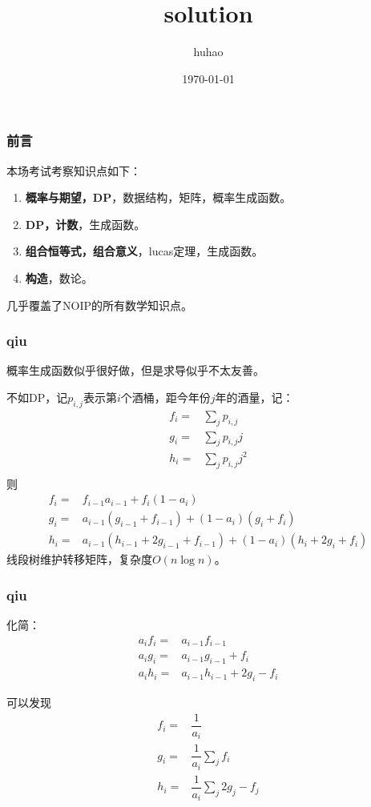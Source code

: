 \documentclass[10pt]{beamer}
\begin{document}
	\title{solution}
	\date{\today}
	\author{huhao}
	\maketitle
	\clearpage
	\begin{frame}
		\frametitle{前言}
		本场考试考察知识点如下：

		\begin{enumerate}
			\item \textbf{概率与期望，DP}，{\color{gray}数据结构，矩阵，概率生成函数}。
			\item \textbf{DP，计数}，生成函数。
			\item \textbf{组合恒等式，组合意义}，lucas定理，{\color{gray}生成函数}。
			\item \textbf{构造}，数论。
		\end{enumerate}

		几乎覆盖了NOIP的所有{\color[rgb]{0.8,0.8,0.8}数学}知识点。
	\end{frame}
	\clearpage
	\begin{frame}
		\frametitle{qiu}

		 概率生成函数似乎很好做，但是求导似乎不太友善。

		 不如DP，记$p_{i,j}$表示第$i$个酒桶，距今年份$j$年的酒量，记：
		$$
		\begin{aligned}
			f_i=&\sum_{j}p_{i,j}\\
			g_i=&\sum_{j}p_{i,j}j\\
			h_i=&\sum_{j}p_{i,j}j^2\\
		\end{aligned}
		$$
		\onslide<3-> 则
		$$
		\begin{aligned}
		f_i=&f_{i-1}a_{i-1}+f_i(1-a_i)\\
		g_i=&a_{i-1}(g_{i-1}+f_{i-1})+(1-a_i)(g_i+f_i)\\
		h_i=&a_{i-1}(h_{i-1}+2g_{i-1}+f_{i-1})+(1-a_i)(h_i+2g_i+f_i)
		\end{aligned}
		$$
		\onslide<4-> 线段树维护转移矩阵，复杂度$O(n\log n)$。
	\end{frame}
	\clearpage
	\begin{frame}
		\frametitle{qiu}
		\onslide<1->化简：
		$$
		\begin{aligned}
			a_if_i=&a_{i-1}f_{i-1}\\
			a_ig_i=&a_{i-1}g_{i-1}+f_i\\
			a_ih_i=&a_{i-1}h_{i-1}+2g_i-f_i
		\end{aligned}
		$$

		\onslide<2->可以发现
		$$
		\begin{aligned}
			f_i=&\dfrac{1}{a_i}\\
			g_i=&\dfrac{1}{a_i}\sum_j f_i\\
			h_i=&\dfrac{1}{a_i}\sum_j 2g_j-f_j
		\end{aligned}
		$$

	\end{frame}
\end{document}
